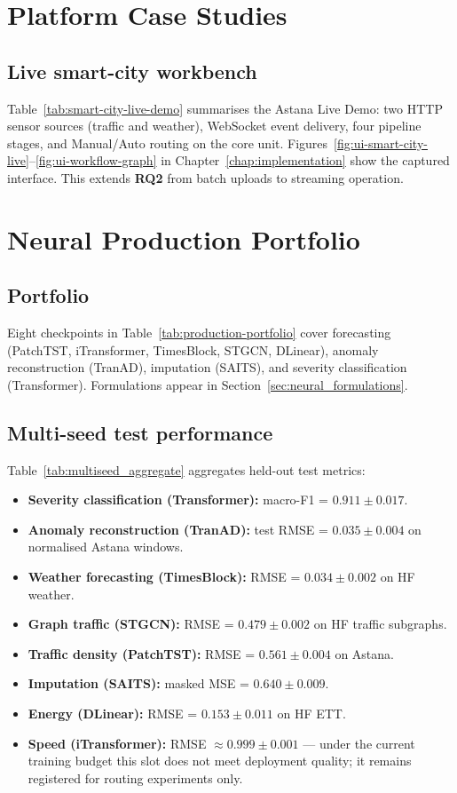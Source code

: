 \section{Platform Case Studies}
\label{sec:platform_cases}

\subsection{Live smart-city workbench}

Table~\ref{tab:smart-city-live-demo} summarises the Astana Live Demo: two HTTP sensor sources (traffic and weather), WebSocket event delivery, four pipeline stages, and Manual/Auto routing on the core unit. Figures~\ref{fig:ui-smart-city-live}--\ref{fig:ui-workflow-graph} in Chapter~\ref{chap:implementation} show the captured interface. This extends \textbf{RQ2} from batch uploads to streaming operation.

\section{Neural Production Portfolio}
\label{sec:neural_portfolio}

\subsection{Portfolio}

Eight checkpoints in Table~\ref{tab:production-portfolio} cover forecasting (PatchTST, iTransformer, TimesBlock, STGCN, DLinear), anomaly reconstruction (TranAD), imputation (SAITS), and severity classification (Transformer). Formulations appear in Section~\ref{sec:neural_formulations}.

\subsection{Multi-seed test performance}

Table~\ref{tab:multiseed_aggregate} aggregates held-out test metrics:
\begin{itemize}
  \item \textbf{Severity classification (Transformer):} macro-F1 = $0.911 \pm 0.017$.
  \item \textbf{Anomaly reconstruction (TranAD):} test RMSE = $0.035 \pm 0.004$ on normalised Astana windows.
  \item \textbf{Weather forecasting (TimesBlock):} RMSE = $0.034 \pm 0.002$ on HF weather.
  \item \textbf{Graph traffic (STGCN):} RMSE = $0.479 \pm 0.002$ on HF traffic subgraphs.
  \item \textbf{Traffic density (PatchTST):} RMSE = $0.561 \pm 0.004$ on Astana.
  \item \textbf{Imputation (SAITS):} masked MSE = $0.640 \pm 0.009$.
  \item \textbf{Energy (DLinear):} RMSE = $0.153 \pm 0.011$ on HF ETT.
  \item \textbf{Speed (iTransformer):} RMSE $\approx 0.999 \pm 0.001$ --- under the current training budget this slot does not meet deployment quality; it remains registered for routing experiments only.
\end{itemize}

